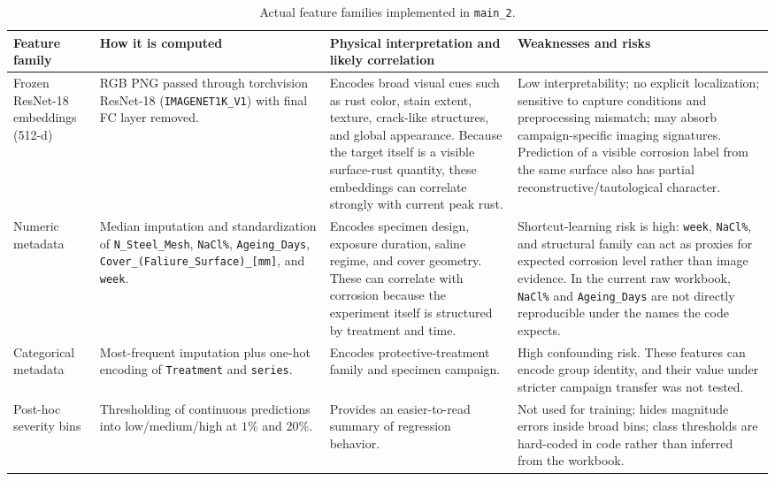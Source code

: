 \documentclass[11pt]{article}
\begin{document}
\begin{table}[H]
\centering
\small
\begin{tabularx}{\textwidth}{p{} p{} Y Y}
\toprule
\textbf{Feature family} & \textbf{How it is computed} & \textbf{Physical interpretation and likely correlation} & \textbf{Weaknesses and risks} \\
\midrule
Frozen ResNet-18 embeddings (512-d) & RGB PNG passed through torchvision ResNet-18 (\texttt{IMAGENET1K\_V1}) with final FC layer removed. & Encodes broad visual cues such as rust color, stain extent, texture, crack-like structures, and global appearance. Because the target itself is a visible surface-rust quantity, these embeddings can correlate strongly with current peak rust. & Low interpretability; no explicit localization; sensitive to capture conditions and preprocessing mismatch; may absorb campaign-specific imaging signatures. Prediction of a visible corrosion label from the same surface also has partial reconstructive/tautological character. \\
Numeric metadata & Median imputation and standardization of \texttt{N\_Steel\_Mesh}, \texttt{NaCl\%}, \texttt{Ageing\_Days}, \texttt{Cover\_(Faliure\_Surface)\_[mm]}, and \texttt{week}. & Encodes specimen design, exposure duration, saline regime, and cover geometry. These can correlate with corrosion because the experiment itself is structured by treatment and time. & Shortcut-learning risk is high: \texttt{week}, \texttt{NaCl\%}, and structural family can act as proxies for expected corrosion level rather than image evidence. In the current raw workbook, \texttt{NaCl\%} and \texttt{Ageing\_Days} are not directly reproducible under the names the code expects. \\
Categorical metadata & Most-frequent imputation plus one-hot encoding of \texttt{Treatment} and \texttt{series}. & Encodes protective-treatment family and specimen campaign. & High confounding risk. These features can encode group identity, and their value under stricter campaign transfer was not tested. \\
Post-hoc severity bins & Thresholding of continuous predictions into low/medium/high at \(1\%\) and \(20\%\). & Provides an easier-to-read summary of regression behavior. & Not used for training; hides magnitude errors inside broad bins; class thresholds are hard-coded in code rather than inferred from the workbook. \\
\bottomrule
\end{tabularx}
\caption{Actual feature families implemented in \texttt{main\_2}.}
\label{tab:feature_families}
\end{table}
\end{document}
